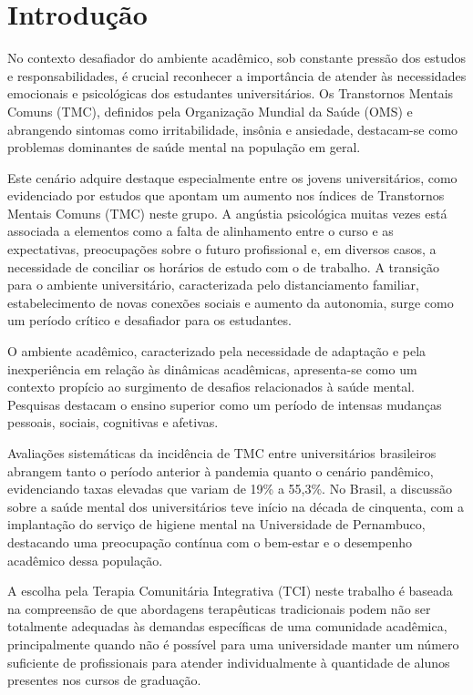 \chapter*[Introdução]{Introdução}
No contexto desafiador do ambiente acadêmico, sob constante pressão dos estudos e responsabilidades, é crucial reconhecer a importância de atender às necessidades emocionais e psicológicas dos estudantes universitários. Os Transtornos Mentais Comuns (TMC), definidos pela Organização Mundial da Saúde (OMS) e abrangendo sintomas como irritabilidade, insônia e ansiedade, destacam-se como problemas dominantes de saúde mental na população em geral\cite{RODRIGUES}.

Este cenário adquire destaque especialmente entre os jovens universitários, como evidenciado por estudos que apontam um aumento nos índices de Transtornos Mentais Comuns (TMC) neste grupo\cite{DUFFY}. A angústia psicológica muitas vezes está associada a elementos como a falta de alinhamento entre o curso e as expectativas, preocupações sobre o futuro profissional e, em diversos casos, a necessidade de conciliar os horários de estudo com o de trabalho\cite{BARROS}. A transição para o ambiente universitário, caracterizada pelo distanciamento familiar, estabelecimento de novas conexões sociais e aumento da autonomia, surge como um período crítico e desafiador para os estudantes\cite{PATTON}.

O ambiente acadêmico, caracterizado pela necessidade de adaptação e pela inexperiência em relação às dinâmicas acadêmicas, apresenta-se como um contexto propício ao surgimento de desafios relacionados à saúde mental\cite{RODRIGUES}. Pesquisas destacam o ensino superior como um período de intensas mudanças pessoais, sociais, cognitivas e afetivas\cite{CASTRO}. 


Avaliações sistemáticas da incidência de TMC entre universitários brasileiros abrangem tanto o período anterior à pandemia quanto o cenário pandêmico, evidenciando taxas elevadas que variam de 19\% a 55,3\%\cite{LOPES}. No Brasil, a discussão sobre a saúde mental dos universitários teve início na década de cinquenta, com a implantação do serviço de higiene mental na Universidade de Pernambuco, destacando uma preocupação contínua com o bem-estar e o desempenho acadêmico dessa população\cite{CASTRO}. 

A escolha pela Terapia Comunitária Integrativa (TCI) neste trabalho é baseada na compreensão de que abordagens terapêuticas tradicionais podem não ser totalmente adequadas às demandas específicas de uma comunidade acadêmica, principalmente quando não é possível para uma universidade manter um número suficiente de profissionais para atender individualmente à quantidade de alunos presentes nos cursos de graduação.

